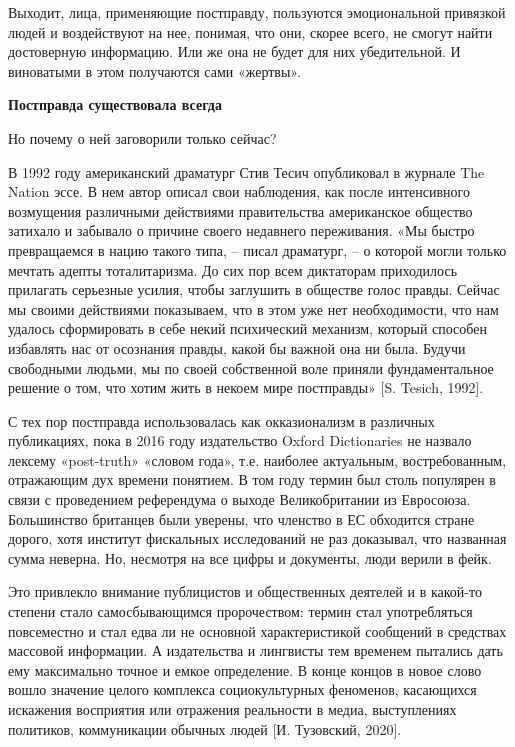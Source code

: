 Выходит, лица, применяющие постправду, пользуются эмоциональной привязкой людей и воздействуют на нее, понимая, что они, скорее всего, не смогут найти достоверную информацию. Или же она не будет для них убедительной. И виноватыми в этом получаются сами «жертвы».

\textbf{Постправда существовала всегда}

Но почему о ней заговорили только сейчас?

В 1992 году американский драматург Стив Тесич опубликовал в журнале The Nation эссе. В нем автор описал свои наблюдения, как после интенсивного возмущения различными действиями правительства американское общество затихало и забывало о причине своего недавнего переживания. «Мы быстро превращаемся в нацию такого типа, – писал драматург, – о которой могли только мечтать адепты тоталитаризма. До сих пор всем диктаторам приходилось прилагать серьезные усилия, чтобы заглушить в обществе голос правды. Сейчас мы своими действиями показываем, что в этом уже нет необходимости, что нам удалось сформировать в себе некий психический механизм, который способен избавлять нас от осознания правды, какой бы важной она ни была. Будучи свободными людьми, мы по своей собственной воле приняли фундаментальное решение о том, что хотим жить в некоем мире постправды» [S. Tesich, 1992].

С тех пор постправда использовалась как окказионализм в различных публикациях, пока в 2016 году издательство Oxford Dictionaries не назвало лексему «post-truth» «словом года», т.е. наиболее актуальным, востребованным, отражающим дух времени понятием. В том году термин был столь популярен в связи с проведением референдума о выходе Великобритании из Евросоюза. Большинство британцев были уверены, что членство в ЕС обходится стране дорого, хотя институт фискальных исследований не раз доказывал, что названная сумма неверна. Но, несмотря на все цифры и документы, люди верили в фейк.

Это привлекло внимание публицистов и общественных деятелей и в какой-то степени стало самосбывающимся пророчеством: термин стал употребляться повсеместно и стал едва ли не основной характеристикой сообщений в средствах массовой информации. А издательства и лингвисты тем временем пытались дать ему максимально точное и емкое определение. В конце концов в новое слово вошло значение целого комплекса социокультурных феноменов, касающихся искажения восприятия или отражения реальности в медиа, выступлениях политиков, коммуникации обычных людей [И. Тузовский, 2020].

